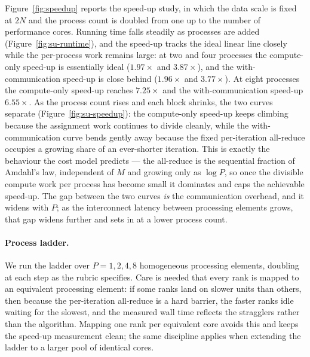 \documentclass[11pt,a4paper]{article}
\begin{document}
Figure~\ref{fig:speedup} reports the speed-up study, in which the data scale is
fixed at $2N$ and the process count is doubled from one up to the number of
performance cores. Running time falls steadily as processes are added
(Figure~\ref{fig:su-runtime}), and the speed-up tracks the ideal linear line
closely while the per-process work remains large: at two and four processes the
compute-only speed-up is essentially ideal ($1.97\times$ and $3.87\times$),
and the with-communication speed-up is close behind ($1.96\times$ and
$3.77\times$). At eight processes the compute-only speed-up reaches
$7.25\times$ and the with-communication speed-up $6.55\times$. As the process
count rises and each block shrinks, the two curves separate
(Figure~\ref{fig:su-speedup}): the compute-only speed-up keeps climbing because
the assignment work continues to divide cleanly, while the with-communication
curve bends gently away because the fixed per-iteration all-reduce occupies a
growing share of an ever-shorter iteration. This is
exactly the behaviour the cost model predicts --- the all-reduce is the
sequential fraction of Amdahl's law, independent of $M$ and growing only as
$\log P$, so once the divisible compute work per process has become small it
dominates and caps the achievable speed-up. The gap between the two curves
\emph{is} the communication overhead, and it widens with $P$; as the
interconnect latency between processing elements grows, that gap widens further
and sets in at a lower process count.

\paragraph{Process ladder.}
We run the ladder over $P=1,2,4,8$ homogeneous processing elements, doubling at
each step as the rubric specifies. Care is needed that every rank is mapped to an
equivalent processing element: if some ranks land on slower units than others,
then because the per-iteration all-reduce is a hard barrier, the faster ranks
idle waiting for the slowest, and the measured wall time reflects the stragglers
rather than the algorithm. Mapping one rank per equivalent core avoids this and
keeps the speed-up measurement clean; the same discipline applies when extending
the ladder to a larger pool of identical cores.
\end{document}

